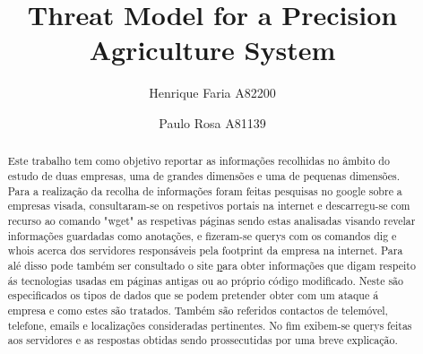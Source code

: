 

\title{Threat Model for a Precision Agriculture System}

\author{Henrique Faria A82200 \and Paulo Rosa A81139}




\maketitle

\begin{abstract}
Este trabalho tem como objetivo reportar as informações recolhidas no âmbito do estudo de duas empresas, uma de grandes dimensões e uma de pequenas dimensões.\newline
Para a realização da recolha de informações foram feitas pesquisas no google sobre a empresas visada, consultaram-se on respetivos portais na internet e descarregu-se com recurso ao comando "wget" as respetivas páginas sendo estas analisadas visando revelar informações guardadas como anotações, e fizeram-se querys com os comandos dig e whois acerca dos servidores responsáveis pela footprint da empresa na internet. Para alé disso pode também ser consultado o site \href{https://web.archive.org} para obter informações que digam respeito ás tecnologias usadas em páginas antigas ou ao próprio código modificado.  
Neste são especificados os tipos de dados que se podem pretender obter com um ataque á empresa e como estes são tratados. Também são referidos contactos de telemóvel, telefone, emails e localizações consideradas pertinentes. No fim exibem-se querys feitas aos servidores e as respostas obtidas sendo prossecutidas por uma breve explicação. 

\end{abstract}
\newpage
